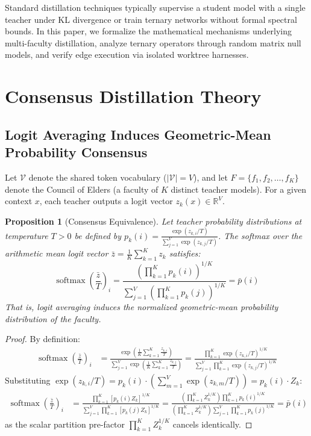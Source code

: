 \documentclass[11pt,a4paper]{article}
\newtheorem{proposition}[theorem]{Proposition}
\begin{document}
Standard distillation techniques typically supervise a student model with a single teacher under KL divergence or train ternary networks without formal spectral bounds. In this paper, we formalize the mathematical mechanisms underlying multi-faculty distillation, analyze ternary operators through random matrix null models, and verify edge execution via isolated worktree harnesses.

\section{Consensus Distillation Theory}

\subsection{Logit Averaging Induces Geometric-Mean Probability Consensus}
Let $\mathcal{V}$ denote the shared token vocabulary ($|\mathcal{V}| = V$), and let $F = \{f_1, f_2, \dots, f_K\}$ denote the Council of Elders (a faculty of $K$ distinct teacher models). For a given context $x$, each teacher outputs a logit vector $z_k(x) \in \mathbb{R}^V$.

\begin{proposition}[Consensus Equivalence]
Let teacher probability distributions at temperature $T > 0$ be defined by $p_k(i) = \frac{\exp(z_{k,i} / T)}{\sum_{j=1}^V \exp(z_{k,j} / T)}$. The softmax over the arithmetic mean logit vector $\bar{z} = \frac{1}{K}\sum_{k=1}^K z_k$ satisfies:
\begin{equation}
    \operatorname{softmax}\left(\frac{\bar{z}}{T}\right)_i = \frac{\left(\prod_{k=1}^K p_k(i)\right)^{1/K}}{\sum_{j=1}^V \left(\prod_{k=1}^K p_k(j)\right)^{1/K}} = \bar{p}(i)
\end{equation}
That is, logit averaging induces the normalized geometric-mean probability distribution of the faculty.
\end{proposition}

\begin{proof}
By definition:
\begin{align*}
    \operatorname{softmax}\left(\frac{\bar{z}}{T}\right)_i &= \frac{\exp\left(\frac{1}{K}\sum_{k=1}^K \frac{z_{k,i}}{T}\right)}{\sum_{j=1}^V \exp\left(\frac{1}{K}\sum_{k=1}^K \frac{z_{k,j}}{T}\right)} = \frac{\prod_{k=1}^K \exp(z_{k,i}/T)^{1/K}}{\sum_{j=1}^V \prod_{k=1}^K \exp(z_{k,j}/T)^{1/K}}
\end{align*}
Substituting $\exp(z_{k,i}/T) = p_k(i) \cdot \left(\sum_{m=1}^V \exp(z_{k,m}/T)\right) = p_k(i) \cdot Z_k$:
\begin{align*}
    \operatorname{softmax}\left(\frac{\bar{z}}{T}\right)_i &= \frac{\prod_{k=1}^K [p_k(i) Z_k]^{1/K}}{\sum_{j=1}^V \prod_{k=1}^K [p_k(j) Z_k]^{1/K}} = \frac{\left(\prod_{k=1}^K Z_k^{1/K}\right) \prod_{k=1}^K p_k(i)^{1/K}}{\left(\prod_{k=1}^K Z_k^{1/K}\right) \sum_{j=1}^V \prod_{k=1}^K p_k(j)^{1/K}} = \bar{p}(i)
\end{align*}
as the scalar partition pre-factor $\prod_{k=1}^K Z_k^{1/K}$ cancels identically.
\end{proof}
\end{document}

